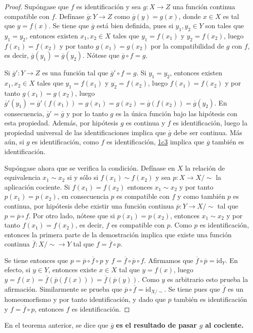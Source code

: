 \begin{proof}
Supóngase que $f$ es identificación y sea $g : X \longrightarrow Z$ una función continua compatible con $f$. Defínase $\overline{g} : Y \longrightarrow Z$ como $\overline{g}(y) = g(x)$, donde $x \in X$ es tal que $y = f(x)$. Se tiene que $\overline{g}$ está bien definida, pues si $y_1, y_2 \in Y$ son tales que $y_1 = y_2$, entonces existen $x_1, x_2 \in X$ tales que $y_1 = f(x_1)$ y $y_2 = f(x_2)$, luego $f(x_1) = f(x_2)$ y por tanto $g(x_1) = g(x_2)$ por la compatibilidad de $g$ con $f$, es decir, $\overline{g}(y_1) = \overline{g}(y_2)$. Nótese que $\overline{g} \circ f = g$.
\bigskip

Si $\overline{g}' : Y \longrightarrow Z$ es una función tal que $\overline{g}' \circ f = g$. Si $y_1 = y_2$, entonces existen $x_1, x_2 \in X$ tales que $y_1 = f(x_1)$ y $y_2 = f(x_2)$, luego $f(x_1) = f(x_2)$ y por tanto $g(x_1) = g(x_2)$, luego $\overline{g}'(y_1) = \overline{g}'(f(x_1)) = g(x_1) = g(x_2) = \overline{g}(f(x_2)) = \overline{g}(y_2)$. En consecuencia, $\overline{g}' = \overline{g}$ y por lo tanto $g$ es la única función bajo las hipótesis con esta propiedad. Además, por hipótesis $g$ es continua y $f$ es identificación, luego la propiedad universal de las identificaciones implica que $\overline{g}$ debe ser continua. Más aún, si $g$ es identificación, como $f$ es identificación, \hyperref[card:1c3]{\textsf{1c3}} implica que $\overline{g}$ también es identificación.
\bigskip

Supóngase ahora que se verifica la condición. Defínase en $X$ la relación de equivalencia $x_1 \sim x_2$ si y sólo si $f(x_1) \sim f(x_2)$ y sea $p : X \longrightarrow X/\sim$ la aplicación cociente. Si $f(x_1) = f(x_2)$ entonces $x_1 \sim x_2$ y por tanto $p(x_1) = p(x_2)$, en consecuencia $p$ es compatible con $f$ y como también $p$ es continua, por hipótesis debe existir una función continua $\overline{p} : Y \longrightarrow X/\sim$ tal que $p = \overline{p} \circ f$. Por otro lado, nótese que si $p(x_1) = p(x_2)$, entonces $x_1 \sim x_2$ y por tanto $f(x_1) = f(x_2)$, es decir, $f$ es compatible con $p$. Como $p$ es identificación, entonces la primera parte de la demostración implica que existe una función continua $\overline{f} : X/\sim \longrightarrow Y$ tal que $f = \overline{f} \circ p$.
\bigskip

Se tiene entonces que $p = \overline{p} \circ \overline{f} \circ p$ y $f = \overline{f} \circ \overline{p} \circ f$. Afirmamos que $\overline{f} \circ \overline{p} = \text{id}_Y$. En efecto, si $y \in Y$, entonces existe $x \in X$ tal que $y = f(x)$, luego $y = f(x) = \overline{f}(\overline{p}(f(x))) = \overline{f}(\overline{p}(y))$. Como $y$ es arbitrario esto prueba la afirmación. Similarmente se prueba que $\overline{p} \circ \overline{f} = \text{id}_{X/\sim}$. Se tiene pues que $\overline{f}$ es un homeomorfismo y por tanto identificación, y dado que $p$ también es identificación y $f = \overline{f} \circ p$, entonces $f$ es identificación.
\end{proof}

\begin{definition}
En el teorema anterior, se dice que $\overline{g}$ \textbf{es el resultado de pasar $g$ al cociente.}
\end{definition}
